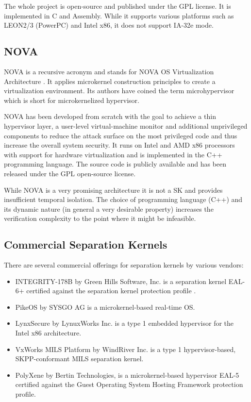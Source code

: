 The whole project is open-source and published under the GPL license. It is
implemented in C and Assembly. While it supports various platforms such as
LEON2/3 (PowerPC) and Intel x86, it does not support IA-32e mode.

\subsection{NOVA}
NOVA is a recursive acronym and stands for NOVA OS Virtualization Architecture
\cite{Steinberg:2010:NMS:1755913.1755935}. It applies microkernel construction
principles to create a virtualization environment. Its authors have coined
the term microhypervisor which is short for
microkernelized hypervisor.

NOVA has been developed from scratch with the goal to achieve a thin hypervisor
layer, a user-level virtual-machine monitor and additional unprivileged
components to reduce the attack surface on the most privileged code and thus
increase the overall system security. It runs on Intel and AMD x86 processors
with support for hardware virtualization and is implemented in the C++
programming language. The source code is publicly available \cite{NOVA} and has
been released under the GPL open-source license.

While NOVA is a very promising architecture it is not a SK and provides
insufficient temporal isolation. The choice of programming language (C++) and
its dynamic nature (in general a very desirable property) increases the
verification complexity to the point where it might be infeasible.

\subsection{Commercial Separation Kernels}\label{subsec:commercial-sks}
There are several commercial offerings for separation kernels by various
vendors:

\begin{itemize}
	\item INTEGRITY-178B by Green Hills Software, Inc. is a separation kernel
		EAL-6+ certified against the separation kernel protection profile
		\cite{SKPP}.
	\item PikeOS by SYSGO AG is a microkernel-based real-time OS.
	\item LynxSecure by LynuxWorks Inc. is a type 1 embedded hypervisor for the
		Intel x86 architecture.
	\item VxWorks MILS Platform by WindRiver Inc. is a type 1 hypervisor-based,
		SKPP-conformant MILS separation kernel.
	\item PolyXene by Bertin Technologies, is a microkernel-based hypervisor
		EAL-5 certified against the Guest Operating System Hosting Framework
		protection profile.
\end{itemize}

